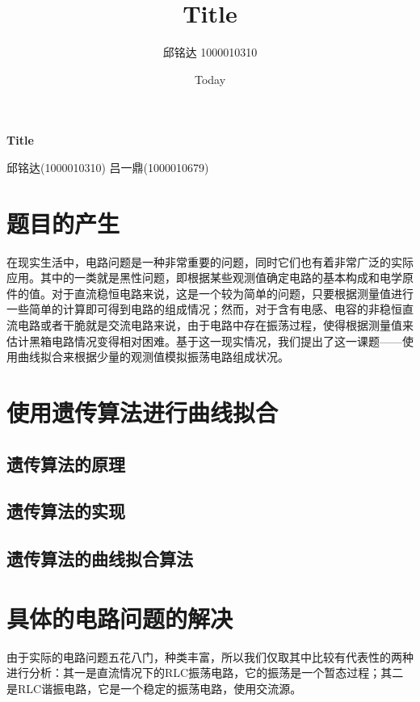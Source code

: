 \documentclass[a4paper]{article}
\begin{document}
\title{Title}
\author{邱铭达 1000010310}
\date{Today}

%
%
\begin{center}
	\Huge \textbf{Title}
\end{center}
\vspace{1 in}
\begin{center}
	\normalsize 邱铭达(1000010310) 吕一鼎(1000010679)
\end{center}
\newpage


\tableofcontents

\section{题目的产生}
在现实生活中，电路问题是一种非常重要的问题，同时它们也有着非常广泛的实际应用。其中的一类就是黑性问题，即根据某些观测值确定电路的基本构成和电学原件的值。对于直流稳恒电路来说，这是一个较为简单的问题，只要根据测量值进行一些简单的计算即可得到电路的组成情况；然而，对于含有电感、电容的非稳恒直流电路或者干脆就是交流电路来说，由于电路中存在振荡过程，使得根据测量值来估计黑箱电路情况变得相对困难。基于这一现实情况，我们提出了这一课题——使用曲线拟合来根据少量的观测值模拟振荡电路组成状况。
%
\section{使用遗传算法进行曲线拟合}
\subsection{遗传算法的原理}
\subsection{遗传算法的实现}
\subsection{遗传算法的曲线拟合算法}

\section{具体的电路问题的解决}
由于实际的电路问题五花八门，种类丰富，所以我们仅取其中比较有代表性的两种进行分析：其一是直流情况下的RLC振荡电路，它的振荡是一个暂态过程；其二是RLC谐振电路，它是一个稳定的振荡电路，使用交流源。
\end{document}
